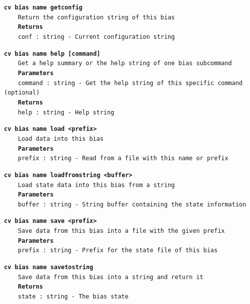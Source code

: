 \begin{mdexampleinput}{}
\texttt{\textbf{cv bias name getconfig}}
\\
\-~~~~\texttt{Return the configuration string of this bias}
\\
\-~~~~\texttt{\textbf{Returns}}
\\
\-~~~~\texttt{conf : string - Current configuration string}
\end{mdexampleinput}
\begin{mdexampleinput}{}
\texttt{\textbf{cv bias name help [command]}}
\\
\-~~~~\texttt{Get a help summary or the help string of one bias subcommand}
\\
\-~~~~\texttt{\textbf{Parameters}}
\\
\-~~~~\texttt{command : string - Get the help string of this specific command (optional)}
\\
\-~~~~\texttt{\textbf{Returns}}
\\
\-~~~~\texttt{help : string - Help string}
\end{mdexampleinput}
\begin{mdexampleinput}{}
\texttt{\textbf{cv bias name load <prefix>}}
\\
\-~~~~\texttt{Load data into this bias}
\\
\-~~~~\texttt{\textbf{Parameters}}
\\
\-~~~~\texttt{prefix : string - Read from a file with this name or prefix}
\end{mdexampleinput}
\begin{mdexampleinput}{}
\texttt{\textbf{cv bias name loadfromstring <buffer>}}
\\
\-~~~~\texttt{Load state data into this bias from a string}
\\
\-~~~~\texttt{\textbf{Parameters}}
\\
\-~~~~\texttt{buffer : string - String buffer containing the state information}
\end{mdexampleinput}
\begin{mdexampleinput}{}
\texttt{\textbf{cv bias name save <prefix>}}
\\
\-~~~~\texttt{Save data from this bias into a file with the given prefix}
\\
\-~~~~\texttt{\textbf{Parameters}}
\\
\-~~~~\texttt{prefix : string - Prefix for the state file of this bias}
\end{mdexampleinput}
\begin{mdexampleinput}{}
\texttt{\textbf{cv bias name savetostring}}
\\
\-~~~~\texttt{Save data from this bias into a string and return it}
\\
\-~~~~\texttt{\textbf{Returns}}
\\
\-~~~~\texttt{state : string - The bias state}
\end{mdexampleinput}
